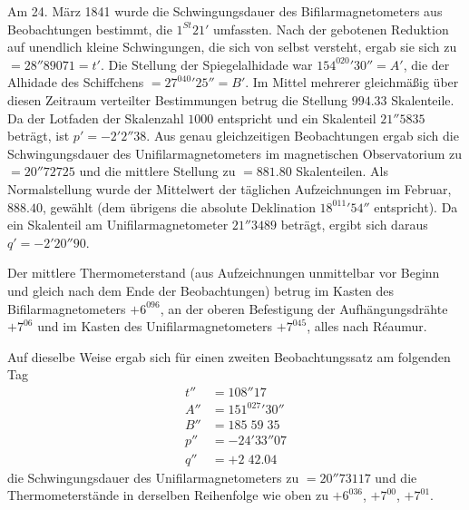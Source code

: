 Am 24. März 1841 wurde die Schwingungsdauer des Bifilarmagnetometers aus Beobachtungen bestimmt, die $1^{St}21'$ umfassten. Nach der gebotenen Reduktion auf unendlich kleine Schwingungen, die sich von selbst versteht, ergab sie sich zu $=28''89071=t'$. Die Stellung der Spiegelalhidade war $154^020'30''=A'$, die der Alhidade des Schiffchens $=27^040'25''=B'$. Im Mittel mehrerer gleichmäßig über diesen Zeitraum verteilter Bestimmungen betrug die Stellung $994.33$ Skalenteile. Da der Lotfaden der Skalenzahl $1000$ entspricht und ein Skalenteil $21''5835$ beträgt, ist $p'=-2'2''38$. Aus genau gleichzeitigen Beobachtungen ergab sich die Schwingungsdauer des Unifilarmagnetometers im magnetischen
Observatorium zu $=20''72725$ und die mittlere Stellung zu $=881.80$ Skalenteilen. Als Normalstellung wurde der Mittelwert der täglichen Aufzeichnungen im Februar, $888.40$, gewählt (dem übrigens die absolute Deklination $18^011'54''$ entspricht). Da ein Skalenteil am Unifilarmagnetometer $21''3489$ beträgt, ergibt sich daraus $q'=-2'20''90$.

Der mittlere Thermometerstand (aus Aufzeichnungen unmittelbar vor Beginn und gleich nach dem Ende der Beobachtungen) betrug im Kasten des Bifilarmagnetometers $+6^096$, an der oberen Befestigung der Aufhängungsdrähte $+7^06$ und im Kasten des Unifilarmagnetometers $+7^045$, alles nach Réaumur.

Auf dieselbe Weise ergab sich für einen zweiten Beobachtungssatz am folgenden Tag
\[
\begin{aligned}
t''&=108''17\\
A''&=151^027'30''\\
B''&=185\;59\;35\\
p''&=-24'33''07\\
q''&=+2\;42.04
\end{aligned}
\]
die Schwingungsdauer des Unifilarmagnetometers zu $=20''73117$ und die Thermometerstände in derselben Reihenfolge wie oben zu $+6^036$, $+7^00$, $+7^01$.

